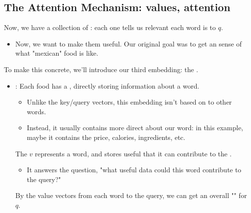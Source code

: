         




    \phantom{}

    \subsection{The Attention Mechanism: values, attention}

        Now, we have a collection of : each one tells us relevant each word is to $q$.

        \begin{itemize}
            \item Now, we want to make them useful. Our original goal was to get an  sense of what "mexican" food is like.
        \end{itemize}

        To make this concrete, we'll introduce our third embedding: the .

        \begin{itemize}
            \item {}: Each food has a , directly storing information about a word.

            \begin{itemize}
                \item Unlike the key/query vectors, this embedding isn't based on  to other words.

                \item Instead, it usually contains more direct  about our word: in this example, maybe it contains the price, calories, ingredients, etc.
                    \\
            \end{itemize}

            \begin{definition}
                The  $v$ represents a word, and stores useful  that it can contribute to the .

                \begin{itemize}
                    \item It answers the question, "what useful data could this word contribute to the query?"
                \end{itemize}

                By  the value vectors from each word  to the query, we can get an overall "" for $q$.
            \end{definition}
        \end{itemize}

